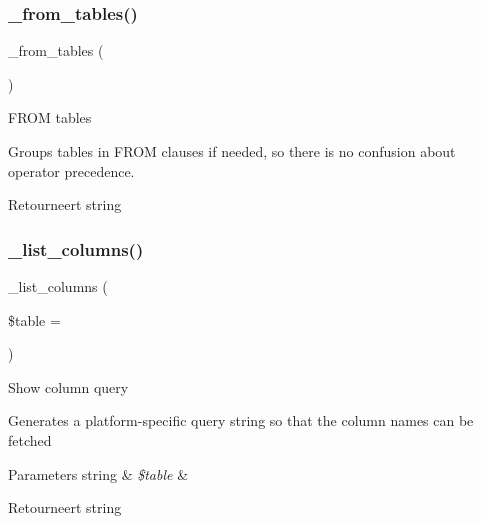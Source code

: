 \subsubsection{\texorpdfstring{\_from\_tables()}{\_from\_tables()}}
{\footnotesize\ttfamily \+\_\+from\+\_\+tables (\begin{DoxyParamCaption}{ }\end{DoxyParamCaption})\hspace{0.3cm}{\ttfamily [protected]}}

F\+R\+OM tables

Groups tables in F\+R\+OM clauses if needed, so there is no confusion about operator precedence.

\begin{DoxyReturn}{Retourneert}
string 
\end{DoxyReturn}
\mbox{\label{class_c_i___d_b__cubrid__driver_a7ccb7f9c301fe7f0a9db701254142b63}} 
\subsubsection{\texorpdfstring{\_list\_columns()}{\_list\_columns()}}
{\footnotesize\ttfamily \+\_\+list\+\_\+columns (\begin{DoxyParamCaption}\item[{}]{\$table = {\ttfamily \textquotesingle{}\textquotesingle{}} }\end{DoxyParamCaption})\hspace{0.3cm}{\ttfamily [protected]}}

Show column query

Generates a platform-\/specific query string so that the column names can be fetched


\begin{DoxyParams}[1]{Parameters}
string & {\em \$table} & \\
\hline
\end{DoxyParams}
\begin{DoxyReturn}{Retourneert}
string 
\end{DoxyReturn}
\mbox{\label{class_c_i___d_b__cubrid__driver_a435c0f3ce54fe7daa178baa8532ebd54}} 

